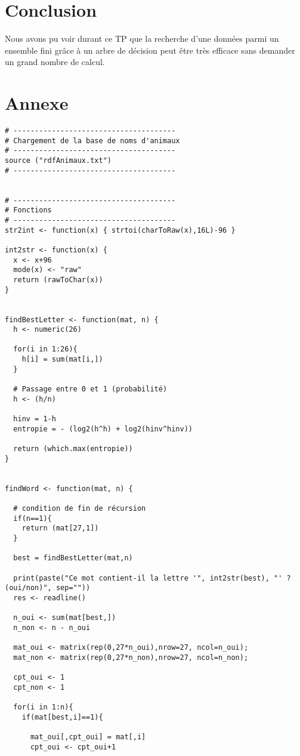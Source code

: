 \documentclass[a4paper,11pt]{article}
\begin{document}
  
  \section{Conclusion}
  Nous avons pu voir durant ce TP que la recherche d'une données parmi un ensemble fini grâce à un arbre de 
  décision peut être très efficace sans demander un grand nombre de calcul.
  
  \section{Annexe}
  \begin{lstlisting}[caption=Ensemble des fonctions du TP]
   # --------------------------------------
# Chargement de la base de noms d'animaux
# --------------------------------------
source ("rdfAnimaux.txt")
# --------------------------------------


# --------------------------------------
# Fonctions
# --------------------------------------
str2int <- function(x) { strtoi(charToRaw(x),16L)-96 }

int2str <- function(x) {
  x <- x+96
  mode(x) <- "raw"
  return (rawToChar(x))
}


findBestLetter <- function(mat, n) {
  h <- numeric(26)
  
  for(i in 1:26){
    h[i] = sum(mat[i,])
  }
  
  # Passage entre 0 et 1 (probabilité)
  h <- (h/n)
  
  hinv = 1-h
  entropie = - (log2(h^h) + log2(hinv^hinv))
  
  return (which.max(entropie))
}


findWord <- function(mat, n) {
  
  # condition de fin de récursion
  if(n==1){
    return (mat[27,1])
  }
  
  best = findBestLetter(mat,n)
  
  print(paste("Ce mot contient-il la lettre '", int2str(best), "' ? (oui/non)", sep=""))
  res <- readline()
  
  n_oui <- sum(mat[best,])
  n_non <- n - n_oui
  
  mat_oui <- matrix(rep(0,27*n_oui),nrow=27, ncol=n_oui);
  mat_non <- matrix(rep(0,27*n_non),nrow=27, ncol=n_non);
  
  cpt_oui <- 1
  cpt_non <- 1
  
  for(i in 1:n){
    if(mat[best,i]==1){
      
      mat_oui[,cpt_oui] = mat[,i]
      cpt_oui <- cpt_oui+1
      

\end{lstlisting}
\end{document}
